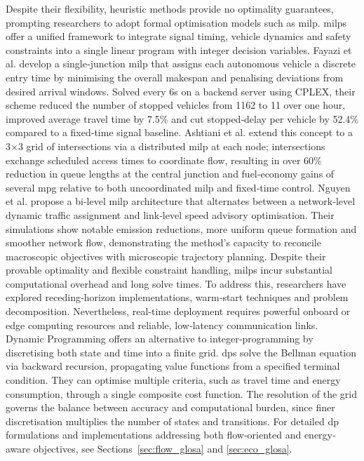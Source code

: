 Despite their flexibility, heuristic methods provide no optimality guarantees, prompting researchers to adopt formal optimisation models such as \ac{milp}. \acp{milp} offer a unified framework to integrate signal timing, vehicle dynamics and safety constraints into a single linear program with integer decision variables. Fayazi et al. \cite{Fayazi2017} develop a single‐junction \ac{milp} that assigns each autonomous vehicle a discrete entry time by minimising the overall makespan and penalising deviations from desired arrival windows. Solved every 6s on a backend server using CPLEX, their scheme reduced the number of stopped vehicles from 1162 to 11 over one hour, improved average travel time by 7.5\% and cut stopped‐delay per vehicle by 52.4\% compared to a fixed‐time signal baseline. Ashtiani et al. \cite{Ashtiani2018} extend this concept to a 3×3 grid of intersections via a distributed \ac{milp} at each node; intersections exchange scheduled access times to coordinate flow, resulting in over 60\% reduction in queue lengths at the central junction and fuel‐economy gains of several \ac{mpg} relative to both uncoordinated \ac{milp} and fixed‐time control. Nguyen et al. \cite{Nguyen2022} propose a bi‐level \ac{milp} architecture that alternates between a network‐level dynamic traffic assignment and link‐level speed advisory optimisation. Their simulations show notable emission reductions, more uniform queue formation and smoother network flow, demonstrating the method’s capacity to reconcile macroscopic objectives with microscopic trajectory planning. Despite their provable optimality and flexible constraint handling, \acp{milp} incur substantial computational overhead and long solve times. To address this, researchers have explored receding‐horizon implementations, warm‐start techniques and problem decomposition. Nevertheless, real‐time deployment requires powerful onboard or edge computing resources and reliable, low‐latency communication links.   
\mynewline
Dynamic Programming offers an alternative to integer‐programming by discretising both state and time into a finite grid. \acp{dp} solve the Bellman equation via backward recursion, propagating value functions from a specified terminal condition. They can optimise multiple criteria, such as travel time and energy consumption, through a single composite cost function. The resolution of the grid governs the balance between accuracy and computational burden, since finer discretisation multiplies the number of states and transitions. For detailed \ac{dp} formulations and implementations addressing both flow‐oriented and energy‐aware objectives, see Sections~\ref{sec:flow_glosa} and \ref{sec:eco_glosa}.



